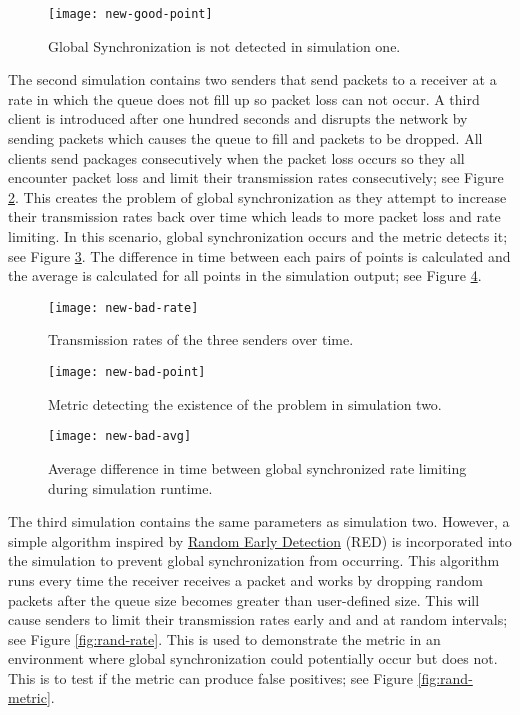 \documentclass{article}
\newcommand{\plotsize}{0.25}
\begin{document}
\begin{figure}[H]
	\centering
	\texttt{[image: new-good-point]}
	\caption{Global Synchronization is not detected in simulation one.}
	\label{fig:good-metric}
\end{figure}

The second simulation contains two senders that send packets to a receiver at a rate in which the queue does not fill up so packet loss can not occur. A third client is introduced after one hundred seconds and disrupts the network by sending packets which causes the queue to fill and packets to be dropped. All clients send packages consecutively when the packet loss occurs so they all encounter packet loss and limit their transmission rates consecutively; see Figure \ref{fig:bad-rate}. This creates the problem of global synchronization as they attempt to increase their transmission rates back over time which leads to more packet loss and rate limiting. In this scenario, global synchronization occurs and the metric detects it; see Figure \ref{fig:bad-metric}. The difference in time between each pairs of points is calculated and the average is calculated for all points in the simulation output; see Figure \ref{fig:bad-avg}.

\begin{figure}[H]
	\centering
	\texttt{[image: new-bad-rate]}
	\caption{Transmission rates of the three senders over time.}
	\label{fig:bad-rate}
\end{figure}

\begin{figure}[H]
	\centering
	\texttt{[image: new-bad-point]}
	\caption{Metric detecting the existence of the problem in simulation two.}
	\label{fig:bad-metric}
\end{figure}

\begin{figure}[H]
	\centering
	\texttt{[image: new-bad-avg]}
	\caption{Average difference in time between global synchronized rate limiting during simulation runtime.}
	\label{fig:bad-avg}
\end{figure}		

The third simulation contains the same parameters as simulation two. However, a simple algorithm inspired by \href{https://en.wikipedia.org/wiki/Random_early_detection}{Random Early Detection} (RED) is incorporated into the simulation to prevent global synchronization from occurring. This algorithm runs every time the receiver receives a packet and works by dropping random packets after the queue size becomes greater than user-defined size. This will cause senders to limit their transmission rates early and and at random intervals; see Figure \ref{fig:rand-rate}. This is used to demonstrate the metric in an environment where global synchronization could potentially occur but does not. This is to test if the metric can produce false positives; see Figure \ref{fig:rand-metric}.
\end{document}
